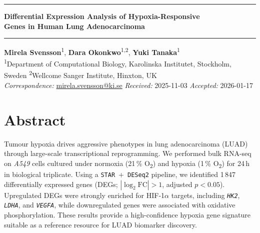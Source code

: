 \documentclass[11pt, a4paper]{article}
\newcommand{\gene}[1]{\texttt{\textit{#1}}}
\newcommand{\tool}[1]{\texttt{#1}}
\newcommand{\accentrule}{\textcolor{teal}{\rule{\linewidth}{1.4pt}}}
\begin{document}
\accentrule
\vspace{6pt}

{\LARGE\bfseries\color{darkgrey}
Differential Expression Analysis of Hypoxia-Responsive\\[3pt]
Genes in Human Lung Adenocarcinoma}

\vspace{6pt}
\accentrule
\vspace{5pt}

{\small\color{midgrey}
\textbf{Mirela Svensson}\textsuperscript{1},\;
\textbf{Dara Okonkwo}\textsuperscript{1,2},\;
\textbf{Yuki Tanaka}\textsuperscript{1}
\\[2pt]
\textsuperscript{1}Department of Computational Biology, Karolinska Institutet, Stockholm, Sweden\quad
\textsuperscript{2}Wellcome Sanger Institute, Hinxton, UK
\\[2pt]
\textit{Correspondence:} \href{mailto:mirela.svensson@ki.se}{mirela.svensson@ki.se}\quad
\textit{Received:} 2025-11-03\quad
\textit{Accepted:} 2026-01-17
}

\vspace{8pt}

\section{Abstract}

\begin{abstractbox}
Tumour hypoxia drives aggressive phenotypes in lung adenocarcinoma (LUAD) through
large-scale transcriptional reprogramming. We performed bulk RNA-seq on \textit{A549}
cells cultured under normoxia (21\,\% O\textsubscript{2}) and hypoxia (1\,\% O\textsubscript{2})
for 24\,h in biological triplicate. Using a \tool{STAR}~+~\tool{DESeq2} pipeline,
we identified 1\,847 differentially expressed genes (DEGs; $|\log_2\text{FC}|>1$,
adjusted $p<0.05$). Upregulated DEGs were strongly enriched for HIF-1$\alpha$ targets,
including \gene{HK2}, \gene{LDHA}, and \gene{VEGFA}, while downregulated genes were
associated with oxidative phosphorylation. These results provide a high-confidence
hypoxia gene signature suitable as a reference resource for LUAD biomarker discovery.
\end{abstractbox}

\vspace{2pt}

\end{document}
